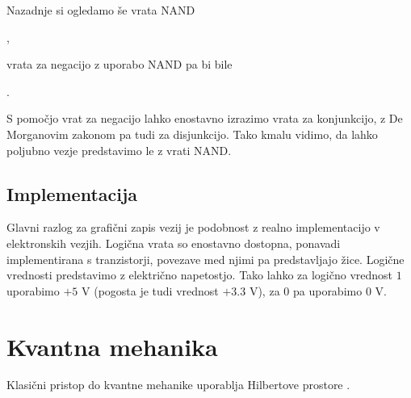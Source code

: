 \documentclass[mat1]{fmfdelo}
\begin{document}
Nazadnje si ogledamo še vrata \textsf{NAND}
\begin{center}
    ,
\end{center}
vrata za negacijo z uporabo \textsf{NAND} pa bi bile
\begin{center}
    .
\end{center}
S pomočjo vrat za negacijo lahko enostavno izrazimo vrata za konjunkcijo, z De Morganovim zakonom pa tudi za disjunkcijo. Tako kmalu vidimo, da lahko poljubno vezje predstavimo le z vrati \textsf{NAND}.

\subsection{Implementacija}
Glavni razlog za grafični zapis vezij je podobnost z realno implementacijo v elektronskih vezjih. Logična vrata so enostavno dostopna, ponavadi implementirana s tranzistorji, povezave med njimi pa predstavljajo žice. Logične vrednosti predstavimo z električno napetostjo. Tako lahko za logično vrednost \(1\) uporabimo \(+5\) V (pogosta je tudi vrednost \(+3.3\) V), za \(0\) pa uporabimo \(0\) V.


\section{Kvantna mehanika}
Klasični pristop do kvantne mehanike uporablja Hilbertove prostore \cite[stran 12]{mathforqm}.
\end{document}
